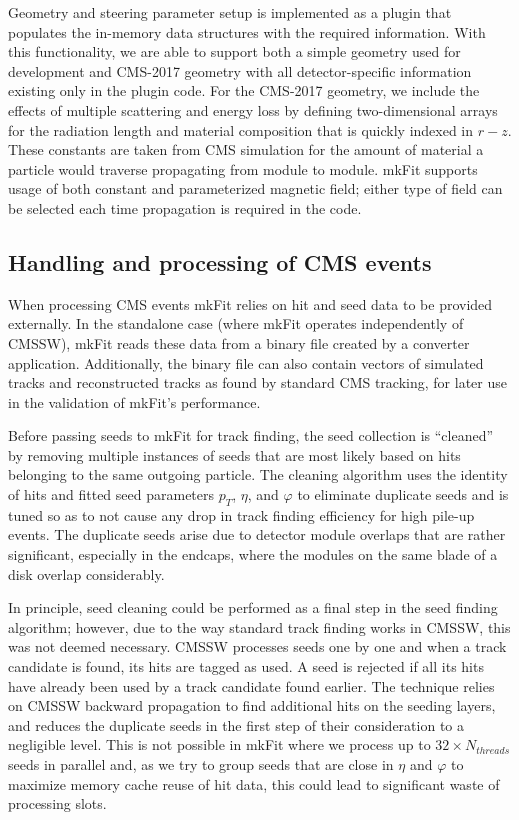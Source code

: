 \documentclass{webofc}
\def\mkfit{mkFit\xspace}
\begin{document}
Geometry and steering parameter setup is implemented as a plugin that
populates the in-memory data structures with the required information. With
this functionality, we are able to support both a simple geometry used for development and
CMS-2017 geometry with all detector-specific information existing only in the
plugin code. For the CMS-2017 geometry, we include the effects of multiple
scattering and energy loss by defining two-dimensional arrays for the
radiation length and material composition that is quickly indexed in
$r-z$. These constants are taken from CMS simulation for the amount of
material a particle would traverse propagating from module to module. \mkfit
supports usage of both constant and parameterized magnetic field; either type of field can
be selected each time propagation is required in the code.

\subsection{Handling and processing of CMS events}
\label{ssec:cms-event-processing}

When processing CMS events \mkfit relies on hit and seed data to be provided
externally. In the standalone case (where mkFit operates independently of CMSSW),
\mkfit reads these data from a binary file
created by a converter application. Additionally, the binary file can also 
contain vectors of simulated tracks and reconstructed tracks as found by 
standard CMS tracking, for later use in the validation of \mkfit's performance.

Before passing seeds to \mkfit for track finding, the seed collection is
``cleaned'' by removing multiple instances of seeds that are most likely 
based on hits belonging to the same outgoing particle. The cleaning
algorithm uses the identity of hits and fitted seed parameters $p_T$, $\eta$,
and $\varphi$ to eliminate duplicate seeds and is tuned so as to not cause any
drop in track finding efficiency for high pile-up events. The duplicate seeds
arise due to detector module overlaps that are rather significant, especially
in the endcaps, where the modules on the same blade of a disk overlap considerably.

In principle, seed cleaning could be performed as a final step in the seed
finding algorithm; however, due to the way standard track finding works in
CMSSW, this was not deemed necessary. CMSSW processes seeds one by one and
when a track candidate is found, its hits are tagged as used. A seed is
rejected if all its hits have already been used by a track candidate found
earlier. The technique relies on CMSSW backward propagation to find additional
hits on the seeding layers, and reduces the duplicate seeds in the first step
of their consideration to a negligible level. This is
not possible in \mkfit where we process up to $32 \times N_{threads}$ seeds in parallel
and, as we try to group seeds that are close in $\eta$ and $\varphi$ to
maximize memory cache reuse of hit data, this could lead to significant waste
of processing slots.
\end{document}
